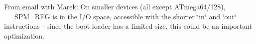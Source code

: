 
\begin{DoxyRefList}
\item[\label{todo__todo000001}%
\hypertarget{todo__todo000001}{}%
Module \hyperlink{group__avr__boot}{avr\+\_\+boot} ]From email with Marek\+: On smaller devices (all except A\+Tmega64/128), \+\_\+\+\_\+\+S\+P\+M\+\_\+\+R\+EG is in the I/O space, accessible with the shorter \char`\"{}in\char`\"{} and \char`\"{}out\char`\"{} instructions -\/ since the boot loader has a limited size, this could be an important optimization.
\end{DoxyRefList}